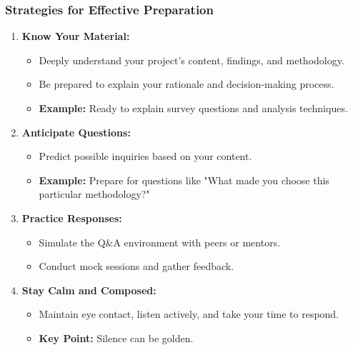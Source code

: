 \documentclass[aspectratio=169]{beamer}
\begin{document}
\begin{frame}[fragile]
    \frametitle{Strategies for Effective Preparation}
    \begin{enumerate}
        \item \textbf{Know Your Material:}
            \begin{itemize}
                \item Deeply understand your project's content, findings, and methodology.
                \item Be prepared to explain your rationale and decision-making process.
                \item \textbf{Example:} Ready to explain survey questions and analysis techniques.
            \end{itemize}
        
        \item \textbf{Anticipate Questions:}
            \begin{itemize}
                \item Predict possible inquiries based on your content.
                \item \textbf{Example:} Prepare for questions like "What made you choose this particular methodology?"
            \end{itemize}

        \item \textbf{Practice Responses:}
            \begin{itemize}
                \item Simulate the Q\&A environment with peers or mentors.
                \item Conduct mock sessions and gather feedback.
            \end{itemize}

        \item \textbf{Stay Calm and Composed:}
            \begin{itemize}
                \item Maintain eye contact, listen actively, and take your time to respond. 
                \item \textbf{Key Point:} Silence can be golden.
            \end{itemize}
    \end{enumerate}
\end{frame}
\end{document}
